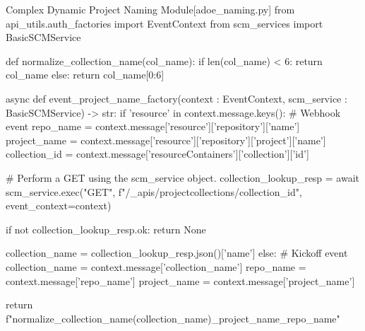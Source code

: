 \begin{code}{Complex Dynamic Project Naming Module}{[adoe\_naming.py]}{}
from api_utils.auth_factories import EventContext
from scm_services import BasicSCMService

def normalize_collection_name(col_name):
    if len(col_name) < 6:
      return col_name
    else:
      return col_name[0:6]

async def event_project_name_factory(context : EventContext, scm_service : BasicSCMService) -> str:
  if 'resource' in context.message.keys():
    # Webhook event
    repo_name = context.message['resource']['repository']['name']
    project_name = context.message['resource']['repository']['project']['name']
    collection_id = context.message['resourceContainers']['collection']['id']

    # Perform a GET using the scm_service object.
    collection_lookup_resp = await scm_service.exec("GET", f"/_apis/projectcollections/{collection_id}", event_context=context)

    if not collection_lookup_resp.ok:
      return None

    collection_name = collection_lookup_resp.json()['name']
  else:
    # Kickoff event
    collection_name = context.message['collection_name']
    repo_name = context.message['repo_name']
    project_name = context.message['project_name']

  return f"{normalize_collection_name(collection_name)}_{project_name}_{repo_name}"
\end{code}




